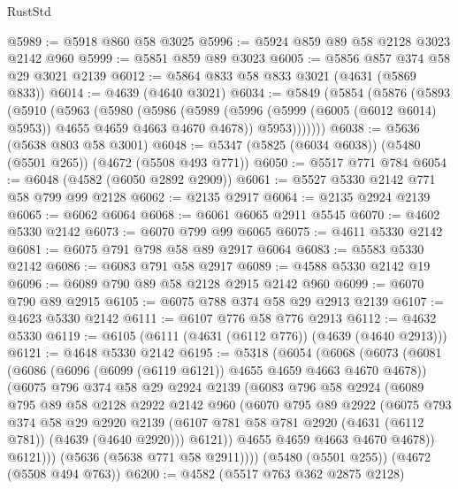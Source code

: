 \begin{lexlean}{RustStd}
\begin{coremodule}
{\begin{coremodule}
{{{{{{{{{{{{{{{{@5989 := @5918 @860 @58 @3025
@5996 := @5924 @859 @89 @58 @2128 @3023 @2142 @960
@5999 := @5851 @859 @89 @3023
@6005 := @5856 @857 @374 @58 @29 @3021 @2139
@6012 := @5864 @833 @58 @833 @3021 (@4631 (@5869 @833))
@6014 := @4639 (@4640 @3021)
@6034 := @5849
    (@5854
      (@5876
        (@5893
          (@5910
            (@5963
              (@5980
                (@5986
                  (@5989 (@5996 (@5999 (@6005 (@6012 @6014) @5953)) @4655 @4659 @4663 @4670 @4678))
                  @5953)))))))
@6038 := @5636 (@5638 @803 @58 @3001)
@6048 := @5347 (@5825 (@6034 @6038)) (@5480 (@5501 @265)) (@4672 (@5508 @493 @771))
@6050 := @5517 @771 @784
@6054 := @6048 (@4582 (@6050 @2892 @2909))
@6061 := @5527 @5330 @2142 @771 @58 @799 @99 @2128
@6062 := @2135 @2917
@6064 := @2135 @2924 @2139
@6065 := @6062 @6064
@6068 := @6061 @6065 @2911 @5545
@6070 := @4602 @5330 @2142
@6073 := @6070 @799 @99 @6065
@6075 := @4611 @5330 @2142
@6081 := @6075 @791 @798 @58 @89 @2917 @6064
@6083 := @5583 @5330 @2142
@6086 := @6083 @791 @58 @2917
@6089 := @4588 @5330 @2142 @19
@6096 := @6089 @790 @89 @58 @2128 @2915 @2142 @960
@6099 := @6070 @790 @89 @2915
@6105 := @6075 @788 @374 @58 @29 @2913 @2139
@6107 := @4623 @5330 @2142
@6111 := @6107 @776 @58 @776 @2913
@6112 := @4632 @5330
@6119 := @6105 (@6111 (@4631 (@6112 @776)) (@4639 (@4640 @2913)))
@6121 := @4648 @5330 @2142
@6195 := @5318
    (@6054
      (@6068
        (@6073
          (@6081
            (@6086 (@6096 (@6099 (@6119 @6121)) @4655 @4659 @4663 @4670 @4678))
            (@6075
              @796
              @374
              @58
              @29
              @2924
              @2139
              (@6083
                @796
                @58
                @2924
                (@6089
                  @795
                  @89
                  @58
                  @2128
                  @2922
                  @2142
                  @960
                  (@6070
                    @795
                    @89
                    @2922
                    (@6075
                      @793
                      @374
                      @58
                      @29
                      @2920
                      @2139
                      (@6107 @781 @58 @781 @2920 (@4631 (@6112 @781)) (@4639 (@4640 @2920)))
                      @6121))
                  @4655
                  @4659
                  @4663
                  @4670
                  @4678))
              @6121)))
        (@5636 (@5638 @771 @58 @2911))))
    (@5480 (@5501 @255))
    (@4672 (@5508 @494 @763))
@6200 := @4582 (@5517 @763 @362 @2875 @2128)
}}}}}}}}}}}}}}}}
\end{coremodule}}
\end{coremodule}
\end{lexlean}
